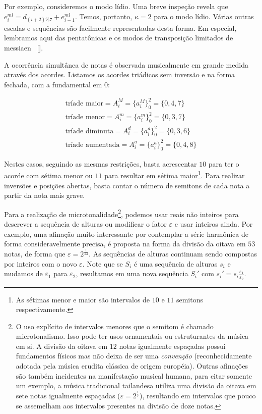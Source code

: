Por exemplo, consideremos o modo lídio. Uma breve
inspeção revela que $e_i^{ml}=d_{(i+2)\%7}+e_{i-1}^{ml}$. Temos, portanto, $\kappa=2$
para o modo lídio. 
Várias outras escalas e sequências são facilmente representadas desta forma. Em especial,
lembramos aqui das pentatônicas e os modos de transposição limitados de messiaen ~\ref{}.

A ocorrência simultânea de notas é observada musicalmente em grande medida
através dos acordes. Listamos os acordes triádicos sem inversão e na forma fechada,
com a fundamental em $0$:

\begin{equation}
\begin{split}
\text{tríade maior} = A_i^M= \{a_i^M\}_0^2=\{0,4,7\} \\ 
\text{tríade menor} = A_i^m = \{a_i^m\}_0^2=\{0,3,7\} \\
\text{tríade diminuta} = A_i^d = \{a_i^d\}_0^2=\{0,3,6\} \\
\text{tríade aumentada} = A_i^a = \{a_i^a\}_0^2=\{0,4,8\}
\end{split}
\end{equation}

Nestes casos, seguindo as mesmas restrições, basta acrescentar $10$ para ter o acorde
com sétima menor ou $11$ para resultar em sétima maior\footnote{As sétimas
menor e maior são intervalos de $10$ e $11$ semitons respectivamente.}. Para realizar inversões e posições abertas,
basta contar o número de semitons de cada nota a partir da nota mais grave.

Para a realização de microtonalidade\footnote{O uso explícito de
intervalos menores que o semitom é chamado microtonalismo. Isso pode ter usos
ornamentais ou estruturantes da música em si. A
divisão da oitava em $12$ notas igualmente espaçadas possui fundamentos físicos mas
não deixa de ser uma \emph{convenção}
(reconhecidamente adotada pela música erudita clássica de origem européia). Outras afinações
são também incidentes na manifestação musical humana, para citar somente um exemplo, a
música tradicional tailandesa utiliza uma divisão da oitava em sete notas igualmente
espaçadas ($\varepsilon=2^{\frac{1}{7}}$),
resultando em intervalos que pouco se assemelham aos intervalos presentes na
divisão de doze notas.}, podemos usar reais não inteiros
para descrever a sequência de alturas ou modificar o fator $\varepsilon$
e usar inteiros ainda. Por exemplo, uma afinação muito
interessante por contemplar a série harmônica de forma consideravelmente precisa,
é proposta na forma da divisão da oitava em $53$ notas, de forma
que $\varepsilon=2^{\frac{1}{53}}$. As sequências de alturas
continuam sendo compostas por inteiros com o novo $\varepsilon$.
Note que se $S_i$ é uma sequência de alturas $s_i$ e mudamos de $\varepsilon_1$ para
$\varepsilon_2$,
resultamos em uma nova sequência $S_i'$ com $s_i'=s_i \frac{\varepsilon_1}{\varepsilon_2}$.

